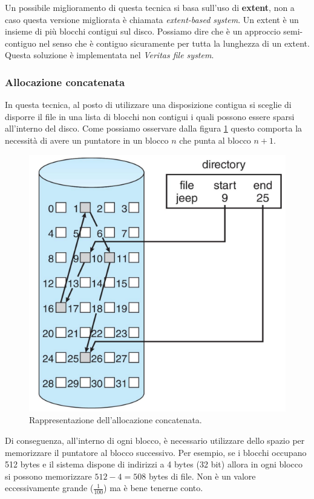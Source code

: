 Un possibile miglioramento di questa tecnica si basa sull'uso di \textbf{extent}, non a caso questa versione migliorata è chiamata \textit{extent-based system}. Un extent è un insieme di più blocchi contigui sul disco. Possiamo dire che è un approccio semi-contiguo nel senso che è contiguo sicuramente per tutta la lunghezza di un extent. Questa soluzione è implementata nel \textit{Veritas file system}. 

% 
\subsubsection{Allocazione concatenata}
In questa tecnica, al posto di utilizzare una disposizione contigua si sceglie di disporre il file in una lista di blocchi non contigui i quali possono essere sparsi all'interno del disco. Come possiamo osservare dalla figura \ref{fig:allocazione concatenata} questo comporta la necessità di avere un puntatore in un blocco $n$ che punta al blocco $n + 1$.
\begin{figure}[h]
    \centering
    \includegraphics[width = .5\textwidth]{../res/imgs/file system implementation/allocazione concatenata.png}
    \caption{Rappresentazione dell'allocazione concatenata.}
    \label{fig:allocazione concatenata}
\end{figure}
Di conseguenza, all'interno di ogni blocco, è necessario utilizzare dello spazio per memorizzare il puntatore al blocco successivo. Per esempio, se i blocchi occupano 512 bytes e il sistema dispone di indirizzi a 4 bytes (32 bit) allora in ogni blocco si possono memorizzare $512 - 4 = 508$ bytes di file. Non è un valore eccessivamente grande ($\frac{1}{100}$) ma è bene tenerne conto.

